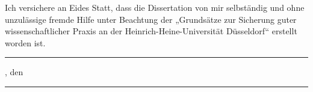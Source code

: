 \label{sec:declaration}
\thispagestyle{empty}
%
Ich versichere an Eides Statt, dass die Dissertation von mir selbständig und ohne unzulässige fremde Hilfe unter Beachtung der „Grundsätze zur Sicherung guter wissenschaftlicher Praxis an der Heinrich-Heine-Universität Düsseldorf“ erstellt worden ist. \\[2cm]
%
	\begin{minipage}{5cm}
		\rule{\textwidth}{1pt}
		\centering \thesisUniversityCity, den
	\end{minipage}
\hfill
	\begin{minipage}{5cm}
		\rule{\textwidth}{1pt}
		\centering\thesisName
	\end{minipage}
%
